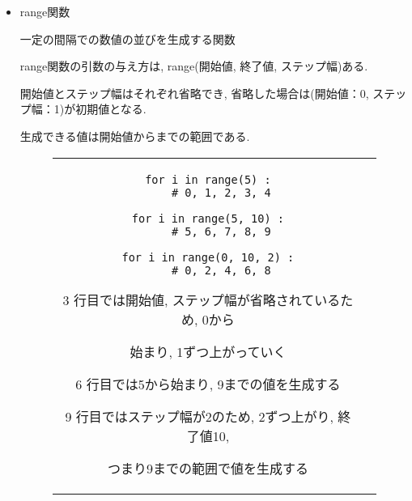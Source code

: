 \documentclass[dvipdfmx]{jsbook}
\newcommand{\info}[2]{\begin{tcolorbox}[colframe=gray, colback=black!10!white, coltitle=white, fonttitle=\bfseries, title={#1}]
{#2}\end{tcolorbox}}
\begin{document}
\begin{itemize}
	\item range関数 \par
	      一定の間隔での数値の並びを生成する関数 \par
	      range関数の引数の与え方は, range(開始値, 終了値, ステップ幅)ある.  \par
	      開始値とステップ幅はそれぞれ省略でき, 省略した場合は(開始値：0, ステップ幅：1)が初期値となる.  \par
	      生成できる値は開始値から{}までの範囲である.

	      \begin{figure}[htp]
		      \begin{tabular}{cc} \hspace{5truemm}
			      \begin{minipage}[ht]{.31\textwidth}
				      \begin{lstlisting}[caption=range関数]
for i in range(5) :
	# 0, 1, 2, 3, 4

for i in range(5, 10) :
	# 5, 6, 7, 8, 9

for i in range(0, 10, 2) :
	# 0, 2, 4, 6, 8
	\end{lstlisting}
			      \end{minipage} \hspace{5truemm}
			      \begin{minipage}[ht]{.58\textwidth}
				      \info{説明}{3 行目では開始値, ステップ幅が省略されているため, 0から\par 始まり, 1ずつ上がっていく\par
					      6 行目では5から始まり, 9までの値を生成する\par
					      9 行目ではステップ幅が2のため, 2ずつ上がり, 終了値10, \par つまり9までの範囲で値を生成する}
			      \end{minipage}
		      \end{tabular}
	      \end{figure}
\end{itemize}
\end{document}
